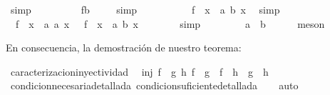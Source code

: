 \begin{isabellebody}
\ simp\isanewline
\ \ \ \ \isamarkupfalse%
\ \isamarkupfalse%
\ {\isachardoublequoteopen}{\isachardot}{\isachardot}{\isachardot}\ {\isacharequal}\ f{\isacharparenleft}b{\isacharparenright}{\isachardoublequoteclose}\ \isamarkupfalse%
\ {}\ \isamarkupfalse%
\ simp\isanewline
\ \ \ \ \isamarkupfalse%
\ \isamarkupfalse%
\ {\isachardoublequoteopen}{\isachardot}{\isachardot}{\isachardot}\ {\isacharequal}\ \ {\isacharparenleft}f\ {\isasymcirc}\ {\isacharparenleft}{\isasymlambda}x\ {\isacharcolon}{\isacharcolon}\ {\isacharprime}a{\isachardot}\ b{\isacharparenright}{\isacharparenright}\ x{\isachardoublequoteclose}\ \isamarkupfalse%
\ simp\isanewline
\ \ \ \ \isamarkupfalse%
\ \isamarkupfalse%
\ {\isachardoublequoteopen}\ {\isacharparenleft}f\ {\isasymcirc}\ {\isacharparenleft}{\isasymlambda}x\ {\isacharcolon}{\isacharcolon}\ {\isacharprime}a{\isachardot}\ a{\isacharparenright}{\isacharparenright}\ x\ {\isacharequal}\ \ {\isacharparenleft}f\ {\isasymcirc}\ {\isacharparenleft}{\isasymlambda}x\ {\isacharcolon}{\isacharcolon}\ {\isacharprime}a{\isachardot}\ b{\isacharparenright}{\isacharparenright}\ x{\isachardoublequoteclose}\isanewline
\ \ \ \ \ \ \isamarkupfalse%
\ simp\isanewline
\ \ \isamarkupfalse%
\isanewline
\ \ \isamarkupfalse%
\ \ {\isachardoublequoteopen}\ a\ {\isacharequal}\ b{\isachardoublequoteclose}\ \isamarkupfalse%
\ {}\ {}\ \isamarkupfalse%
\ meson\isanewline
{}\isamarkupfalse%
%
\endisatagproof
{\isafoldproof}%
%
\isadelimproof
%
\endisadelimproof
%
\isadelimdocument
%
\endisadelimdocument
%
\isatagdocument
%
\isamarkuptrue%
%
\endisatagdocument
{\isafolddocument}%
%
\isadelimdocument
%
\endisadelimdocument
%
\begin{isamarkuptext}%
En consecuencia, la demostración de nuestro teorema:%
\end{isamarkuptext}\isamarkuptrue%
\isamarkupfalse%
\ caracterizacion{\isacharunderscore}inyectividad{\isacharcolon}\isanewline
\ \ {\isachardoublequoteopen}inj\ f\ {\isasymlongleftrightarrow}\ {\isacharparenleft}{\isasymforall}g\ h{\isachardot}\ {\isacharparenleft}f\ {\isasymcirc}\ g\ {\isacharequal}\ f\ {\isasymcirc}\ h{\isacharparenright}\ {\isasymlongrightarrow}\ {\isacharparenleft}g\ {\isacharequal}\ h{\isacharparenright}{\isacharparenright}{\isachardoublequoteclose}\isanewline
%
\isadelimproof
\ \ %
\endisadelimproof
%
\isatagproof
{}\isamarkupfalse%
\ condicion{\isacharunderscore}necesaria{\isacharunderscore}detallada\ condicion{\isacharunderscore}suficiente{\isacharunderscore}detallada\isanewline
\ \ \isamarkupfalse%
\ auto\isanewline
\isanewline
\isanewline
\isanewline
\isanewline
%
\endisatagproof
{\isafoldproof}%
%
\isadelimproof
%
\endisadelimproof
%
\isadelimtheory
%
\endisadelimtheory
%
\isatagtheory
%
\endisatagtheory
{\isafoldtheory}%
%
\isadelimtheory
%
\endisadelimtheory
%
\end{isabellebody}%
